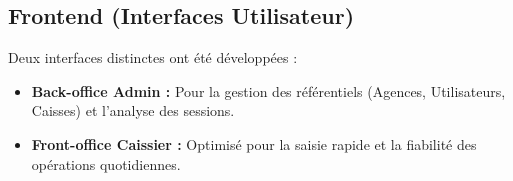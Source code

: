\subsection{Frontend (Interfaces Utilisateur)}
Deux interfaces distinctes ont été développées :
\begin{itemize}
    \item \textbf{Back-office Admin :} Pour la gestion des référentiels (Agences, Utilisateurs, Caisses) et l'analyse des sessions.
    \item \textbf{Front-office Caissier :} Optimisé pour la saisie rapide et la fiabilité des opérations quotidiennes.
\end{itemize}
